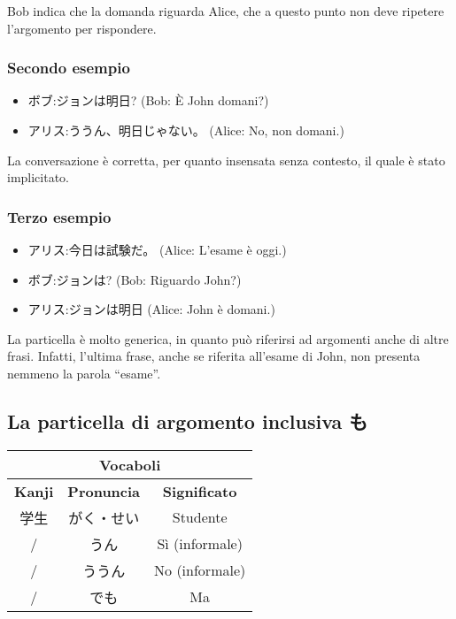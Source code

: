 \documentclass{article}
\let\ita\textitalian
\let\jap\textjapanese
\newcommand{\itabf}[1]{\ita{\textbf{#1}}}
\newenvironment{tabVoc}{\begin{center}\begin{japanese}\begin{longtable}{|c|c|c|}}{\end{longtable}\end{japanese}\end{center}}
\begin{document}
                Bob indica che la domanda riguarda Alice, che a questo punto non deve ripetere l'argomento per rispondere.

            \subsubsection*{Secondo esempio}

                \begin{itemize}
                    \item \jap{ボブ:ジョンは明日?} (Bob: È John domani?)
                    \item \jap{アリス:ううん、明日じゃない。} (Alice: No, non domani.)
                \end{itemize}

                La conversazione è corretta, per quanto insensata senza contesto, il quale è stato implicitato.

            \subsubsection*{Terzo esempio}

                \begin{itemize}
                    \item \jap{アリス:今日は試験だ。} (Alice: L'esame è oggi.)
                    \item \jap{ボブ:ジョンは?} (Bob: Riguardo John?)
                    \item \jap{アリス:ジョンは明日} (Alice: John è domani.)
                \end{itemize}

                La particella è molto generica, in quanto può riferirsi ad argomenti anche di altre frasi. Infatti, l'ultima frase,
                anche se riferita all'esame di John, non presenta nemmeno la parola ``esame''.

        \subsection{La particella di argomento inclusiva \jap{も}}

            \begin{tabVoc}
                \hline
                \multicolumn{3}{|c|}{\itabf{Vocaboli}}\\
                \hline
                \itabf{Kanji} & \itabf{Pronuncia} & \itabf{Significato}\\
                \hline\hline
                学生 & がく・せい & \ita{Studente}\\
                \hline
                / & うん & \ita{Sì (informale)}\\
                \hline
                / & ううん & \ita{No (informale)}\\
                \hline
                / & でも & \ita{Ma}\\
                \hline
            \end{tabVoc}
\end{document}
